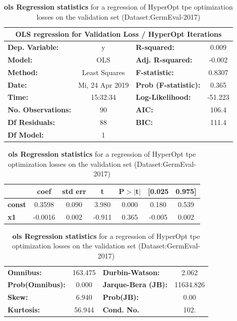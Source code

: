 \begin{table}[H]
	\begin{center}
		\begin{tabular}{lclc}
		\toprule
		\multicolumn{4}{c}{OLS regression for Validation Loss / HyperOpt Iterations} \\
		\midrule
		\textbf{Dep. Variable:}    &        y        & \textbf{  R-squared:        } &     0.009   \\
		\textbf{Model:}            &       OLS       & \textbf{  Adj. R-squared:   } &    -0.002   \\
		\textbf{Method:}           &  Least Squares  & \textbf{  F-statistic:      } &    0.8307   \\
		\textbf{Date:}             & Mi, 24 Apr 2019 & \textbf{  Prob (F-statistic):} &    0.365    \\
		\textbf{Time:}             &     15:32:34    & \textbf{  Log-Likelihood:   } &   -51.223   \\
		\textbf{No. Observations:} &          90     & \textbf{  AIC:              } &     106.4   \\
		\textbf{Df Residuals:}     &          88     & \textbf{  BIC:              } &     111.4   \\
		\textbf{Df Model:}         &           1     & \textbf{                     } &             \\
		\bottomrule
		\end{tabular}
		\begin{tabular}{lcccccc}
					   & \textbf{coef} & \textbf{std err} & \textbf{t} & \textbf{P$>$$|$t$|$} & \textbf{[0.025} & \textbf{0.975]}  \\
		\midrule
		\textbf{const} &       0.3598  &        0.090     &     3.980  &         0.000        &        0.180    &        0.539     \\
		\textbf{x1}    &      -0.0016  &        0.002     &    -0.911  &         0.365        &       -0.005    &        0.002     \\
		\bottomrule
		\end{tabular}
		\begin{tabular}{lclc}
		\textbf{Omnibus:}       & 163.475 & \textbf{  Durbin-Watson:    } &     2.062  \\
		\textbf{Prob(Omnibus):} &   0.000 & \textbf{  Jarque-Bera (JB): } & 11634.826  \\
		\textbf{Skew:}          &   6.940 & \textbf{  Prob(JB):         } &      0.00  \\
		\textbf{Kurtosis:}      &  56.944 & \textbf{  Cond. No.          } &      102.  \\
		\bottomrule
		\end{tabular}
	\end{center}
	\caption{\textbf{\gls{ols} Regression statistics} for a regression of HyperOpt \gls{tpe} optimization losses on the validation set {(Dataset:GermEval-2017)}}
	\label{tab:08_olsLossItVal}	
\end{table}

